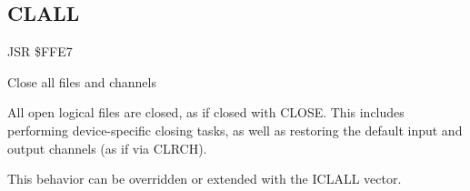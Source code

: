 \subsection{CLALL}
\label{KERNAL Jump Table!CLALL}
\begin{description}[leftmargin=2cm,style=nextline]
    \item [Address:] JSR \$FFE7
    \item [Description:] Close all files and channels
    \item [Remarks:]
        All open logical files are closed, as if closed with CLOSE. This includes performing device-specific closing tasks, as well as restoring the default input and output channels (as if via CLRCH).

        This behavior can be overridden or extended with the ICLALL vector.
    \item [Example:]
\end{description}



\newpage
